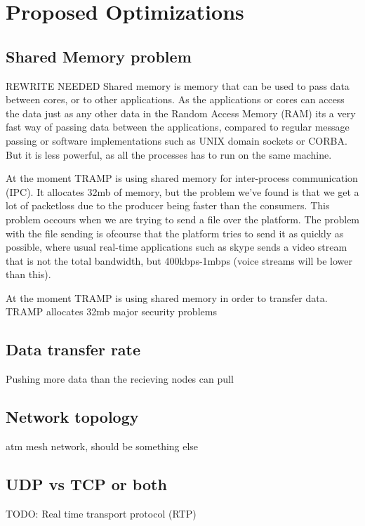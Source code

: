 \section{Proposed Optimizations}
\label{sec:optimizations}

\subsection{Shared Memory problem}
REWRITE NEEDED
Shared memory is memory that can be used to pass data between cores, or to other applications. As the applications or cores can access the data just as any other data in the Random Access Memory (RAM) its a very fast way of passing data between the applications, compared to regular message passing or software implementations such as UNIX domain sockets or CORBA. But it is less powerful, as all the processes has to run on the same machine.

At the moment TRAMP is using shared memory for inter-process communication (IPC). It allocates 32mb of memory, but the problem we've found is that we get a lot of packetloss due to the producer being faster than the consumers. This problem occours when we are trying to send a file over the platform. The problem with the file sending is ofcourse that the platform tries to send it as quickly as possible, where usual real-time applications such as skype sends a video stream that is not the total bandwidth, but 400kbps-1mbps (voice streams will be lower than this).

At the moment TRAMP is using shared memory in order to transfer data. TRAMP allocates 32mb
major security problems\cite{shared_memory}

\subsection{Data transfer rate}
Pushing more data than the recieving nodes can pull

\subsection{Network topology}
atm mesh network, should be something else

\subsection{UDP vs TCP or both}
TODO: Real time transport protocol (RTP)





